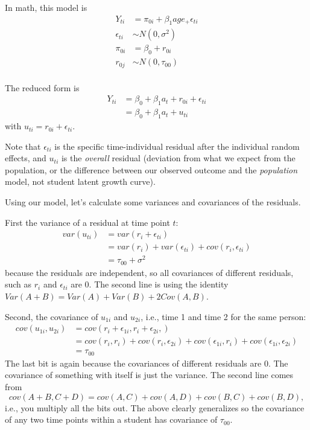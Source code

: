\documentclass[
  letterpaper,
  DIV=11,
  numbers=noendperiod]{scrreprt}
\begin{document}
In math, this model is \[\begin{aligned}
Y_{ti} &= \pi_{0i} + \beta_{1} age_ + \epsilon_{ti} \\
\epsilon_{ti} &\sim N( 0, \sigma^2 ) \\
\pi_{0i} &=  \beta_{0} + r_{0i} \\
 r_{0j} & \sim N( 0, \tau_{00} ) \\
\end{aligned}\]

The reduced form is \[\begin{aligned}
 Y_{ti} &= \beta_{0}  + \beta_{1}  a_t  + r_{0i} + \epsilon_{ti} \\ 
 &= \beta_{0}  + \beta_{1}  a_t  + u_{ti} 
\end{aligned}\] with \(u_{ti} = r_{0i} + \epsilon_{ti}\).

Note that \(\epsilon_{ti}\) is the specific time-individual residual
after the individual random effects, and \(u_{ti}\) is the
\emph{overall} residual (deviation from what we expect from the
population, or the difference between our observed outcome and the
\emph{population} model, not student latent growth curve).

Using our model, let's calculate some variances and covariances of the
residuals.

First the variance of a residual at time point \(t\): \[
\begin{aligned}
var( u_{ti} ) &= var( r_{i} + \epsilon_{ti} ) \\
  &= var( r_{i} ) + var( \epsilon_{ti} ) + cov( r_i, \epsilon_{ti} ) \\
  &= \tau_{00} + \sigma^2 
\end{aligned}
\] because the residuals are independent, so all covariances of
different residuals, such as \(r_i\) and \(\epsilon_{ti}\) are 0. The
second line is using the identity
\(Var( A + B ) = Var( A ) + Var( B ) + 2 Cov( A, B )\).

Second, the covariance of \(u_{1i}\) and \(u_{2i}\), i.e., time 1 and
time 2 for the same person: \[
\begin{aligned}
cov( u_{1i}, u_{2i} ) &= cov( r_{i} + \epsilon_{1i}, r_{i} + \epsilon_{2i},  ) \\
  &= cov( r_{i}, r_{i} ) + cov( r_{i}, \epsilon_{2i} ) + cov( \epsilon_{1i}, r_i ) + cov( \epsilon_{1i}, \epsilon_{2i} ) \\
  &= \tau_{00}
\end{aligned}
\] The last bit is again because the covariances of different residuals
are 0. The covariance of something with itself is just the variance. The
second line comes from
\[cov( A + B, C + D ) = cov( A, C ) + cov( A, D ) + cov( B, C ) + cov( B, D ),\]
i.e., you multiply all the bits out. The above clearly generalizes so
the covariance of any two time points within a student has covariance of
\(\tau_{00}\).
\end{document}
